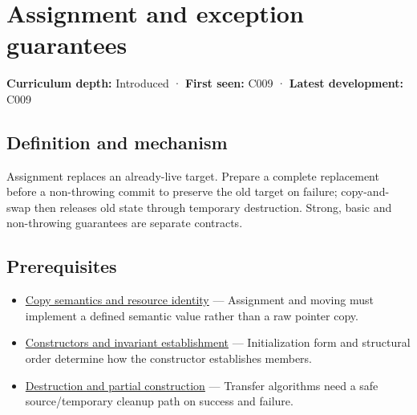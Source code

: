 \hypertarget{appendix-bea6beb5350f}{}\label{referencestart:appendix-bea6beb5350f}
\section{Assignment and exception guarantees}\label{appendix-bea6beb5350f-assignment-and-exception-guarantees}

\hypertarget{appendix-bea6beb5350f-assignment-and-exception-guarantees}{}

\textbf{Curriculum depth:} Introduced · \textbf{First seen:} C009 · \textbf{Latest development:} C009

\begin{allmightroledefinition}

\subsection{Definition and mechanism}\label{appendix-bea6beb5350f-definition-and-mechanism}

\hypertarget{appendix-bea6beb5350f-definition-and-mechanism}{}

Assignment replaces an already-live target. Prepare a complete replacement before a non-throwing commit to preserve the old target on failure; copy-and-swap then releases old state through temporary destruction. Strong, basic and non-throwing guarantees are separate contracts.

\end{allmightroledefinition}

\subsection{Prerequisites}\label{appendix-bea6beb5350f-prerequisites}

\hypertarget{appendix-bea6beb5350f-prerequisites}{}

\begin{itemize}
\tightlist
\item
  \hyperref[appendix-1340cd1ce582]{Copy semantics and resource identity} --- Assignment and moving must implement a defined semantic value rather than a raw pointer copy.
\item
  \hyperref[appendix-7f8ec83d0886]{Constructors and invariant establishment} --- Initialization form and structural order determine how the constructor establishes members.
\item
  \hyperref[appendix-9bfe377cef7a]{Destruction and partial construction} --- Transfer algorithms need a safe source/temporary cleanup path on success and failure.
\end{itemize}

